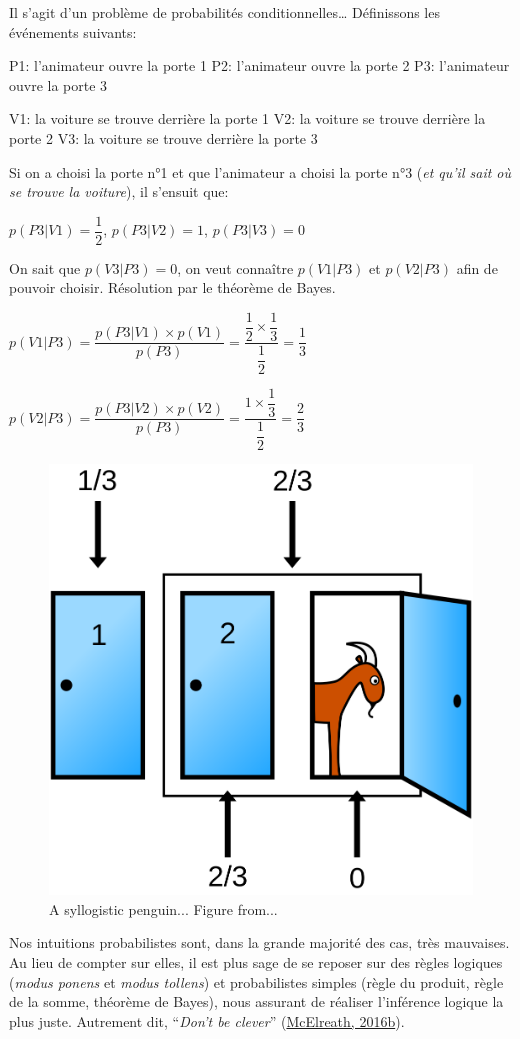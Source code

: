 \documentclass[
  a4paper,11pt,twoside,onecolumn,openright,final,oldfontcommands]{memoir}
\theoremstyle{definition}
\theoremstyle{definition}
\theoremstyle{definition}
\theoremstyle{definition}
\theoremstyle{remark}
\begin{document}
Il s'agit d'un problème de probabilités conditionnelles\ldots{} Définissons les événements suivants:

P1: l'animateur ouvre la porte 1
P2: l'animateur ouvre la porte 2
P3: l'animateur ouvre la porte 3

V1: la voiture se trouve derrière la porte 1
V2: la voiture se trouve derrière la porte 2
V3: la voiture se trouve derrière la porte 3

Si on a choisi la porte n°1 et que l'animateur a choisi la porte n°3 (\emph{et qu'il sait où se trouve la voiture}), il s'ensuit que:

\(p(P3|V1)=\dfrac{1}{2}\), \(p(P3|V2)=1\), \(p(P3|V3)=0\)

On sait que \(p(V3|P3)=0\), on veut connaître \(p(V1|P3)\) et \(p(V2|P3)\) afin de pouvoir choisir. Résolution par le théorème de Bayes.

\(p(V1|P3)=\dfrac{p(P3|V1) \times p(V1)}{p(P3)}=\dfrac{\dfrac{1}{2} \times \dfrac{1}{3}}{\dfrac{1}{2}}=\dfrac{1}{3}\)

\(p(V2|P3)=\dfrac{p(P3|V2) \times p(V2)}{p(P3)}=\dfrac{1 \times \dfrac{1}{3}}{\dfrac{1}{2}}=\dfrac{2}{3}\)

\begin{figure}[!htb]

{\centering \includegraphics[width=0.5\linewidth]{figures/monty2} 

}

\caption{A syllogistic penguin... Figure from...}\label{fig:monty2}
\end{figure}

Nos intuitions probabilistes sont, dans la grande majorité des cas, très mauvaises. Au lieu de compter sur elles, il est plus sage de se reposer sur des règles logiques (\emph{modus ponens} et \emph{modus tollens}) et probabilistes simples (règle du produit, règle de la somme, théorème de Bayes), nous assurant de réaliser l'inférence logique la plus juste. Autrement dit, ``\emph{Don't be clever}'' (\protect\hyperlink{ref-mcelreath_statistical_2016}{McElreath, 2016b}).
\end{document}
